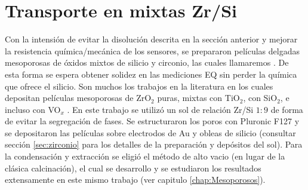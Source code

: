 			
	
    




	\section{Transporte en \pdm\space mixtas Zr/Si}

			Con la intensión de evitar la disolución descrita en la sección anterior y mejorar la resistencia química/mecánica de los sensores, se prepararon películas delgadas mesoporosas de óxidos mixtos de silicio y circonio, las cuales llamaremos \pdmZ. De esta forma se espera obtener solidez en las mediciones EQ sin perder la química que ofrece el silicio. Son muchos los trabajos en la literatura en los cuales depositan películas mesoporosas de ZrO$_2$ puras, mixtas con TiO$_2$, con SiO$_2$, e incluso con VO$_x$ \cite{Soler-Illia2004,Crepaldi2002a,Gimenez2016,Zelcer2013,Calvo20210,Angelome2008}. En este trabajo se utilizó un sol de relación Zr/Si $1\!:\!9$ de forma de evitar la segregación de fases\cite{Soler-Illia2004}. Se estructuraron los poros con Pluronic F127 y se depositaron las películas sobre electrodos de Au y obleas de silicio (consultar sección \ref{sec:zirconio} para los detalles de la preparación y depósitos del sol). \marginpar{\color{red}{Falta agregar esto en Materiales}} Para la condensación y extracción se eligió el método de alto vacio (en lugar de la clásica calcinación), el cual se desarrollo y se estudiaron los resultados extensamente en este mismo trabajo (ver capitulo \ref{chap:Mesoporosos}).

